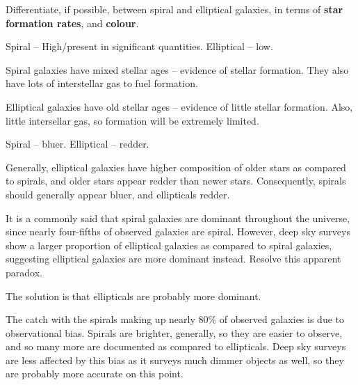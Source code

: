 \documentclass[a4paper,11pt]{exam}
\begin{document}
\begin{questions}
\question[2]
	Differentiate, if possible, between spiral and elliptical galaxies, in terms of \textbf{star formation rates}, and \textbf{colour}.
	\droppoints
	\begin{solution}
		Spiral -- High/present in significant quantities. Elliptical -- low.
		
		Spiral galaxies have mixed stellar ages -- evidence of stellar formation. They also have lots of interstellar gas to fuel formation.
		
		Elliptical galaxies have old stellar ages -- evidence of little stellar formation. Also, little intersellar gas, so formation will be extremely limited.
		
		Spiral -- bluer. Elliptical -- redder.
		
		Generally, elliptical galaxies have higher composition of older stars as compared to spirals, and older stars appear redder than newer stars. Consequently, spirals should generally appear bluer, and ellipticals redder.
	\end{solution}
	
\question[2]
	It is a commonly said that spiral galaxies are dominant throughout the universe, since nearly four-fifths of observed galaxies are spiral. However, deep sky surveys show a larger proportion of elliptical galaxies as compared to spiral galaxies, suggesting elliptical galaxies are more dominant instead. Resolve this apparent paradox.
	\droppoints
	\begin{solution}
		The solution is that ellipticals are probably more dominant.
		
		The catch with the spirals making up nearly $80\%$ of observed galaxies is due to observational bias. Spirals are brighter, generally, so they are easier to observe, and so many more are documented as compared to ellipticals. Deep sky surveys are less affected by this bias as it surveys much dimmer objects as well, so they are probably more accurate on this point.
	\end{solution}
	
\end{questions}
\end{document}
